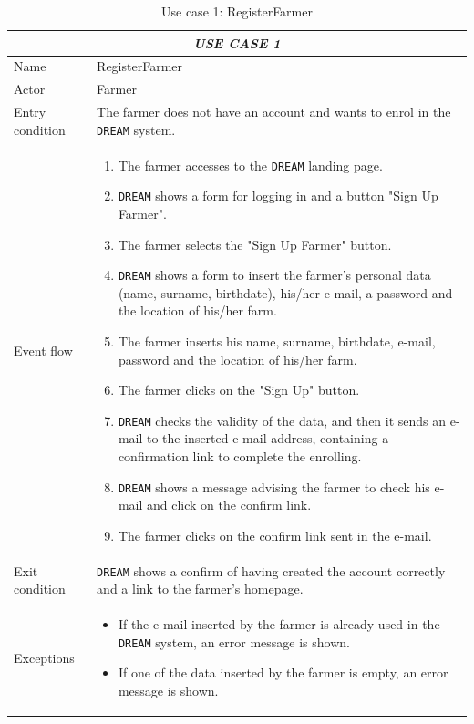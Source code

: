 \documentclass{article}
\begin{document}
\begin{longtable}{|p{3.5cm}|m{8cm}|}
 \caption{Use case 1: RegisterFarmer}
 \label{uc1}
 \hline
 \multicolumn{2}{|c|}{\cellcolor{white}\emph{USE CASE 1}} \\
 \endfirsthead
 \endhead
 \endfoot
 \endlastfoot
 \hline
 Name & RegisterFarmer\\
 \hline
 Actor & Farmer\\
 \hline
 Entry condition & The farmer does not have an account and wants to enrol in the \verb|DREAM| system.\\
 \hline
 Event flow & \begin{enumerate}
    \item The farmer accesses to the \verb|DREAM| landing page.
    \item \verb|DREAM| shows a form for logging in and a button "Sign Up Farmer".
    \item The farmer selects the "Sign Up Farmer" button.
    \item \verb|DREAM| shows a form to insert the farmer's personal data (name, surname, birthdate), his/her e-mail, a password and the location of his/her farm.
    \item The farmer inserts his name, surname, birthdate, e-mail, password and the location of his/her farm.
    \item The farmer clicks on the "Sign Up" button.
    \item \verb|DREAM| checks the validity of the data, and then it sends an e-mail to the inserted e-mail address, containing a confirmation link to complete the enrolling.
    \item \verb|DREAM| shows a message advising the farmer to check his e-mail and click on the confirm link. 
    \item The farmer clicks on the confirm link sent in the e-mail.
 \end{enumerate}\\
 \hline
 Exit condition & \verb|DREAM| shows a confirm of having created the account correctly and a link to the farmer's homepage.\\
 \hline
 Exceptions & \begin{itemize}
     \item If the e-mail inserted by the farmer is already used in the \verb|DREAM| system, an error message is shown.
     \item If one of the data inserted by the farmer is empty, an error message is shown.

\end{itemize}
\end{longtable}
\end{document}
